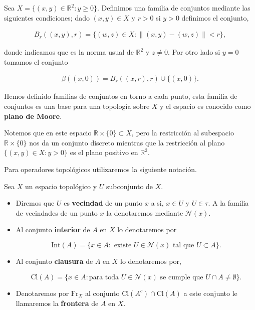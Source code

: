\begin{ej}
Sea $X= \{(x,y) \in \mathbb{R}^2: y \geq 0 \}$. Definimos una familia de conjuntos mediante las siguientes condiciones; dado $(x,y) \in X$ y $r>0$ si $y > 0$ definimos el conjunto,

\begin{align*}
B_r((x,y),r)=\{(w,z) \in X : \| (x,y)-(w,z) \| < r \},
\end{align*}

donde indicamos que es la norma usual de $\mathbb{R}^2$ y $z \neq 0$. Por otro lado si $y=0$ tomamos el conjunto 

\begin{align*}
\beta((x,0))=B_r((x,r),r) \cup \{(x,0)\}.
\end{align*}

Hemos definido familias de conjuntos en torno a cada punto, esta familia de conjuntos es una base para una topología sobre $X$ y el espacio es conocido como \textbf{plano de Moore}.

Notemos que en este espacio $\mathbb{R} \times \{0\} \subset X$, pero la restricción al subespacio $\mathbb{R} \times \{0\}$ nos da un conjunto discreto mientras que la restricción al plano $\{(x,y)\in X :y > 0 \}$ es el plano positivo en $\mathbb{R}^2.$
\end{ej}


Para operadores topológicos utilizaremos la siguiente notación. 

\begin{df}
Sea $X$ un espacio topológico y $U$ subconjunto de $X$.

\begin{itemize}
	\item Diremos que $U$ es \textbf{vecindad} de un punto $x$ a si, $x \in U$ y $U \in \tau$. A la familia de vecindades de un punto $x$ la denotaremos mediante $\mathcal{N}(x)$.
 
 \item Al conjunto \textbf{interior} de $A$ en $X$ lo denotaremos por 
 
  $$\mathrm{Int}(A)=\{x \in A: \text{ existe } U \in \mathcal{N}(x) \text{ tal que } U \subset A\}.$$
  

 \item  Al conjunto  \textbf{clausura} de $A$ en $X$ lo denotaremos por, 
  
$$\mathrm{Cl}(A)=\{x \in A: \text{para toda } U \in \mathcal{N}(x) \text{ se cumple  que } U \cap A \neq \emptyset\}.$$
 
 \item Denotaremos por  $\mathrm{Fr}_X$ al conjunto $\mathrm{Cl}(A^c) \cap \mathrm{Cl}(A) $ a este conjunto le llamaremos la 
  \textbf{frontera} de $A$ en $X$.
 \end{itemize}
\end{df}

